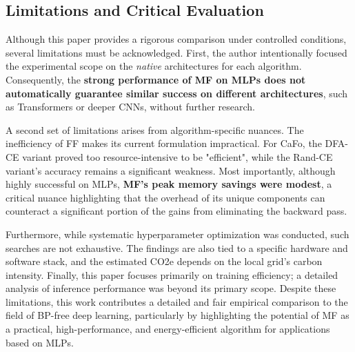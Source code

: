\subsection{Limitations and Critical Evaluation}
\label{sec:discussion_limitations}

Although this paper provides a rigorous comparison under controlled conditions, several limitations must be acknowledged. First, the author intentionally focused the experimental scope on the \textit{native} architectures for each algorithm. Consequently, the \textbf{strong performance of MF on MLPs does not automatically guarantee similar success on different architectures}, such as Transformers or deeper CNNs, without further research.

A second set of limitations arises from algorithm-specific nuances. The inefficiency of FF makes its current formulation impractical. For CaFo, the DFA-CE variant proved too resource-intensive to be "efficient", while the Rand-CE variant's accuracy remains a significant weakness. Most importantly, although highly successful on MLPs, \textbf{MF's peak memory savings were modest}, a critical nuance highlighting that the overhead of its unique components can counteract a significant portion of the gains from eliminating the backward pass.

Furthermore, while systematic hyperparameter optimization was conducted, such searches are not exhaustive. The findings are also tied to a specific hardware and software stack, and the estimated CO2e depends on the local grid's carbon intensity. Finally, this paper focuses primarily on training efficiency; a detailed analysis of inference performance was beyond its primary scope. Despite these limitations, this work contributes a detailed and fair empirical comparison to the field of BP-free deep learning, particularly by highlighting the potential of MF as a practical, high-performance, and energy-efficient algorithm for applications based on MLPs.